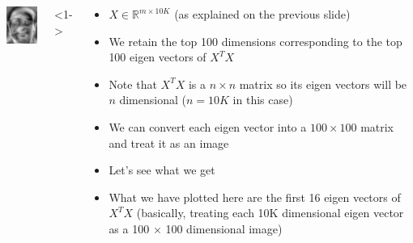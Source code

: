 \begin{frame}
\begin{columns}
\begin{overlayarea}{\textwidth}{\textheight}
{\begin{minipage}[t]{0.15\textwidth}
          \includegraphics[width=\textwidth]{images/eig_docked_image/eig_16.jpeg}
        \end{minipage}
      }
    \end{overlayarea}

    <1->
    \begin{overlayarea}{\textwidth}{\textheight}
      \begin{itemize}\justifying
        \item<1-> $X \in \mathbb{R}^{m \times 10K}$ (as explained on the previous slide)
        \item<2-> We retain the top 100 dimensions corresponding to the top 100 eigen vectors of $X^T X$
        \item<3-> Note that $X^T X$ is a $n \times n$ matrix so its eigen vectors will be $n$ dimensional ($n=10K$ in this case)
        \item<4-> We can convert each eigen vector into a $100 \times 100$ matrix and treat it as an image
        \item<5-> Let's see what we get
        \item<6-> What we have plotted here are the first 16 eigen vectors of $X^T X$ (basically, treating each 10K dimensional eigen vector as a 100 $\times$ 100 dimensional image)

      \end{itemize}
    \end{overlayarea}
  \end{columns}
\end{frame}

